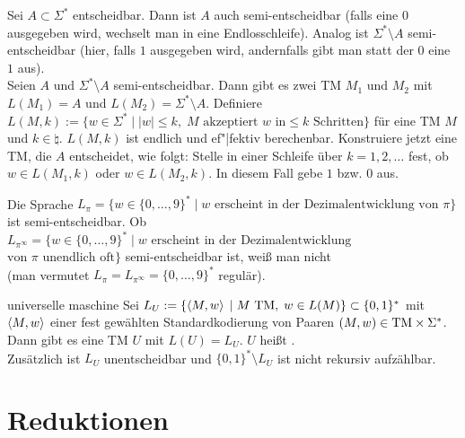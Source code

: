 \begin{Beweis}
    Sei $A \subset \Sigma^\ast$ entscheidbar.
    Dann ist $A$ auch semi-entscheidbar (falls eine $0$ ausgegeben wird, wechselt man in eine
    Endlosschleife).
    Analog ist $\Sigma^\ast \setminus A$ semi-entscheidbar (hier, falls $1$ ausgegeben wird,
    andernfalls gibt man statt der $0$ eine $1$ aus).\\
    Seien $A$ und $\Sigma^\ast \setminus A$ semi-entscheidbar.
    Dann gibt es zwei TM $M_1$ und $M_2$ mit $L(M_1) = A$ und $L(M_2) = \Sigma^\ast \setminus A$.
    Definiere $L(M, k) := \{w \in \Sigma^\ast \;|\;
    |w| \le k,\; M \text{ akzeptiert } w \text { in} \le k \text{ Schritten}\}$
    für eine TM $M$ und $k \in \natural$.
    $L(M, k)$ ist endlich und ef"|fektiv berechenbar.
    Konstruiere jetzt eine TM, die $A$ entscheidet, wie folgt:
    Stelle in einer Schleife über $k = 1, 2, \dotsc$ fest,
    ob $w \in L(M_1, k)$ oder $w \in L(M_2, k)$.
    In diesem Fall gebe $1$ bzw. $0$ aus.
\end{Beweis}

\begin{Bsp}
    Die Sprache $L_\pi = \{w \in \{0, \dotsc, 9\}^\ast \;|\; w \text{ erscheint in der
    Dezimalentwicklung von } \pi\}$ ist semi-entscheidbar.
    Ob $L_{\pi^\infty} = \{w \in \{0, \dotsc, 9\}^\ast \;|\; w \text{ erscheint in der
    Dezimalentwicklung }$ $\text{von } \pi \text{ unendlich oft}\}$ semi-entscheidbar ist,
    weiß man nicht\\
    (man vermutet $L_\pi = L_{\pi^\infty} = \{0, \dotsc, 9\}^\ast$ regulär).
\end{Bsp}

\linie

\begin{Satz}{universelle maschine}
    Sei $L_U := \{\left\langle M, w\right\rangle \;|\; M \text{ TM},\; w \in L(M)\} \subset \{0, 1\}^\ast$
    mit $\left\langle M, w\right\rangle$ einer fest gewählten Standardkodierung von Paaren
    $(M, w) \in \text{TM} \times \Sigma^\ast$.\\
    Dann gibt es eine TM $U$ mit $L(U) = L_U$.
    $U$ heißt .\\
    Zusätzlich ist $L_U$ unentscheidbar und
    $\{0, 1\}^\ast \setminus L_U$ ist nicht rekursiv aufzählbar.
\end{Satz}

\pagebreak

\section{%
    Reduktionen%
}

